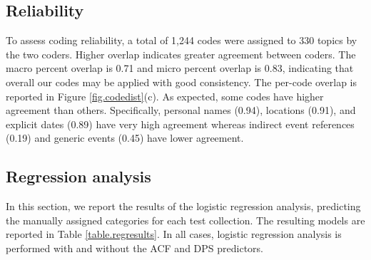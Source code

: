 \documentclass{asist}
\begin{document}

\subsection{Reliability}

To assess coding reliability, a total of 1,244 codes were assigned to 330 topics by the two coders. Higher overlap indicates greater agreement between coders. The macro percent overlap is 0.71 and  micro percent overlap is 0.83, indicating that overall our codes may be applied with good consistency. The per-code overlap is reported in Figure \ref{fig.codedist}(c). As expected, some codes have higher agreement than others. Specifically, personal names (0.94), locations (0.91), and explicit dates (0.89) have very high agreement whereas indirect event references (0.19) and generic events (0.45) have lower agreement.



\subsection{Regression analysis}

In this section, we report the results of the logistic regression analysis, predicting the manually assigned categories for each test collection. The resulting models are reported in Table \ref{table.regresults}. In all cases, logistic regression analysis is performed with and without the ACF and DPS predictors.
\end{document}
